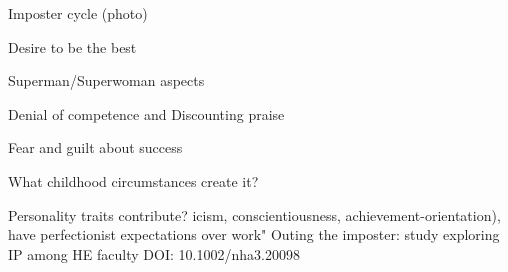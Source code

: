 \documentclass[aspectratio=169]{beamer}
\begin{document}
\begin{frame}
  \begin{center}
    \Huge Imposter cycle (photo)
  \end{center}
\end{frame}

\begin{frame}
  \begin{center}
    \Huge Desire to be the best
  \end{center}
\end{frame}

\begin{frame}
  \begin{center}
    \Huge Superman/Superwoman aspects
  \end{center}
\end{frame}

\begin{frame}
  \begin{center}
    \Huge Denial of competence and Discounting praise
  \end{center}
\end{frame}

\begin{frame}
  \begin{center}
    \Huge Fear and guilt about success
  \end{center}
\end{frame}


\begin{frame}
  \begin{center}
    \Huge What childhood circumstances create it?
  \end{center}
\end{frame}

\begin{frame}
  \begin{center}
    \Huge Personality traits contribute?
    icism, conscientiousness, achievement-orientation), have perfectionist expectations over work"
    Outing the imposter: study exploring IP among HE faculty
    DOI:  10.1002/nha3.20098
  \end{center}
\end{frame}
\end{document}
